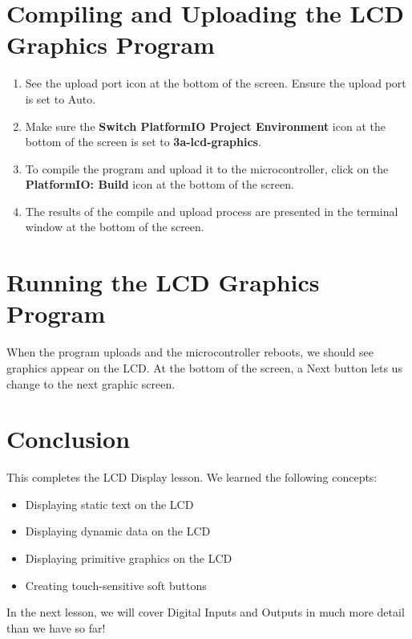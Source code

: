 \documentclass{article}
\begin{document}
\section*{Compiling and Uploading the LCD Graphics Program}
\vspace{3mm}
\begin{enumerate}
    \item See the upload port icon at the bottom of the screen. Ensure the 
    upload port is set to Auto. 
    \vspace{3mm}

    \item Make sure the \textbf{Switch PlatformIO Project Environment} icon 
    at the bottom of the screen is set to \textbf{3a-lcd-graphics}.
    \vspace{3mm}

    \item To compile the program and upload it to the microcontroller, click 
    on the \textbf{PlatformIO: Build} icon at the bottom of the screen.
    \vspace{3mm}

    \item The results of the compile and upload process are presented in the 
    terminal window at the bottom of the screen.
    \vspace{3mm}

\end{enumerate}
\vspace{3mm}

\section*{Running the LCD Graphics Program}

When the program uploads and the microcontroller reboots, we should see 
graphics appear on the LCD.  At the bottom of the screen, a Next button 
lets us change to the next graphic screen.
\newpage


\section*{Conclusion}
This completes the LCD Display lesson.  We learned the following concepts:

\begin{itemize}
    \item Displaying static text on the LCD
    \item Displaying dynamic data on the LCD
    \item Displaying primitive graphics on the LCD
    \item Creating touch-sensitive soft buttons
\end{itemize}
\vspace{3mm}

In the next lesson, we will cover Digital Inputs and Outputs in much more 
detail than we have so far!
\end{document}
